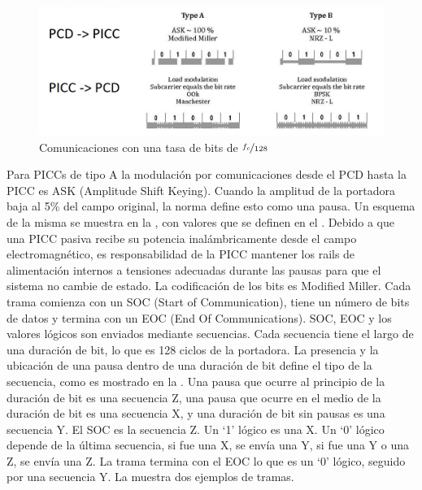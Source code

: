 \documentclass[a4paper, twoside, 11pt]{report}
\begin{document}
\begin{figure}[htb]
\centering
\includegraphics[scale=0.47]{./img/modulation_and_bit_encoding}
\caption{Comunicaciones con una tasa de bits de $\nicefrac{f_c}{128}$~\cite[Adaptado de][]{iso14443-2}}
\label{fig:mod-encode}
\end{figure}

Para PICCs de tipo A la modulación por comunicaciones desde el PCD hasta la PICC es ASK (Amplitude Shift Keying). Cuando la amplitud de la portadora baja al 5\% del campo original, la norma define esto como una pausa. Un esquema de la misma se muestra en la , con valores que se definen en el . Debido a que una PICC pasiva recibe su potencia inalámbricamente desde el campo electromagnético, es responsabilidad de la PICC mantener los rails de alimentación internos a tensiones adecuadas durante las pausas para que el sistema no cambie de estado. La codificación de los bits es Modified Miller. Cada trama comienza con un SOC (Start of Communication), tiene un número de bits de datos y termina con un EOC (End Of Communications). SOC, EOC y los valores lógicos son enviados mediante secuencias. Cada secuencia tiene el largo de una duración de bit, lo que es 128 ciclos de la portadora. La presencia y la ubicación de una pausa dentro de una duración de bit define el tipo de la secuencia, como es mostrado en la . Una pausa que ocurre al principio de la duración de bit es una secuencia Z, una pausa que ocurre en el medio de la duración de bit es una secuencia X, y una duración de bit sin pausas es una secuencia Y. El SOC es la secuencia Z. Un ‘1’ lógico es una X. Un ‘0’ lógico depende de la última secuencia, si fue una X, se envía una Y, si fue una Y o una Z, se envía una Z. La trama termina con el EOC lo que es un ‘0’ lógico, seguido por una secuencia Y. La  muestra dos ejemplos de tramas.
\end{document}
